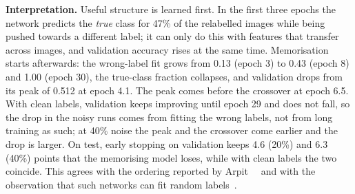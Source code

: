 \textbf{Interpretation.} Useful structure is learned first. In the first three epochs the network predicts the
\emph{true} class for 47\% of the relabelled images while being pushed towards a different label; it can only do
this with features that transfer across images, and validation accuracy rises at the same time. Memorisation
starts afterwards: the wrong-label fit grows from 0.13 (epoch 3) to 0.43 (epoch 8) and 1.00 (epoch 30), the
true-class fraction collapses, and validation drops from its peak of 0.512 at epoch 4.1. The peak comes before
the crossover at epoch 6.5. With clean labels, validation keeps improving until epoch 29 and does not fall, so
the drop in the noisy runs comes from fitting the wrong labels, not from long training as such; at 40\% noise the
peak and the crossover come earlier and the drop is larger. On test, early stopping on validation keeps 4.6
(20\%) and 6.3 (40\%) points that the memorising model loses, while with clean labels the two coincide. This
agrees with the ordering reported by Arpit~\etal~\cite{arpit2017closer} and with the observation that such
networks can fit random labels~\cite{zhang2017rethinking}.
